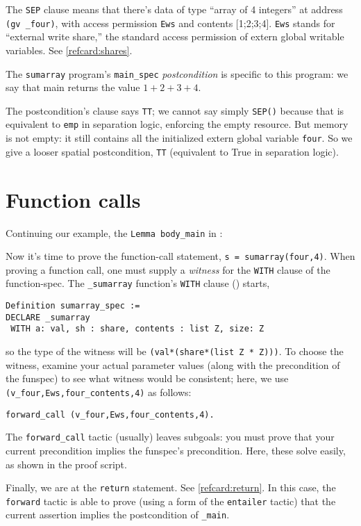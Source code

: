 \documentclass[12pt,fleqn,openany,oneside,showtrims]{memoir}
\begin{document}
The \lstinline{SEP} clause means that there's
data of type ``array of 4 integers'' at
address \lstinline{(gv _four)}, with access permission
\lstinline{Ews} and contents [1;2;3;4].
\lstinline{Ews} stands for ``external write share,''
the standard access permission of extern global writable
variables.  See \autoref{refcard:shares}.

The \lstinline{sumarray} program's \lstinline{main_spec}
\emph{postcondition} is specific to this program:
we say that main returns the value $1+2+3+4$.

The postcondition's \SEP{} clause says \lstinline{TT}; we cannot say simply
\lstinline{SEP()} because that is equivalent to
\lstinline{emp} in separation logic,
enforcing the empty resource.  But memory is not empty:
it still contains all the initialized extern global variable
\lstinline{four}.  So we give a looser spatial postcondition,
\lstinline{TT} (equivalent to True in separation logic).


\chapter{Function calls}
\label{refcard:forward-call}
Continuing our example, the \lstinline{Lemma body_main}
in :

Now it's time to prove the function-call statement,
\lstinline{s = sumarray(four,4)}.
When proving a function call, one must supply
a \emph{witness} for the \lstinline{WITH} clause
of the function-spec.  The \lstinline{_sumarray}
function's \lstinline{WITH} clause ()
starts,
\begin{lstlisting}
Definition sumarray_spec :=
DECLARE _sumarray
 WITH a: val, sh : share, contents : list Z, size: Z
\end{lstlisting}
so the type of the witness will be
\lstinline{(val*(share*(list Z * Z)))}.
To choose the witness, examine your actual parameter values
(along with the precondition of the funspec) to see
what witness would be consistent; here, we use
\lstinline{(v_four,Ews,four_contents,4)} as follows:
\begin{lstlisting}
forward_call (v_four,Ews,four_contents,4).
\end{lstlisting}
The \lstinline{forward_call} tactic (usually) leaves
subgoals: you must prove that your current
precondition implies the funspec's precondition.
Here, these solve easily, as shown in the proof script.

Finally, we are at the \lstinline{return} statement.
See \autoref{refcard:return}.
In this case, the \lstinline{forward} tactic is able to prove
(using a form of the \lstinline{entailer} tactic)
that the current assertion implies the
postcondition of \lstinline{_main}.
\end{document}
